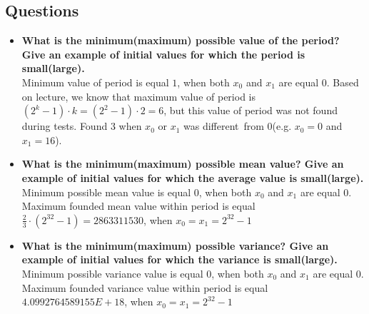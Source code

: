 \documentclass[a4paper,10pt]{article}
\begin{document}
\subsection{Questions}
\begin{itemize}
 \item \textbf{What is the minimum(maximum) possible value of the period? Give an example of initial values for which the period is small(large).} \\
Minimum value of period is equal $1$, when both $x_0$ and $x_1$ are equal $0$. Based on lecture, we know that maximum value of period is
$( 2^k - 1 ) \cdot k = ( 2^2 - 1) \cdot 2 = 6$, but this value of period was not found during tests. Found $3$ when $x_0$ or $x_1$ was different from 0(e.g. $x_0 = 0$ and $x_1 = 16$).

 \item \textbf{What is the minimum(maximum) possible mean value? Give an example of initial values for which the average value is small(large).} \\
Minimum possible mean value is equal $0$, when both $x_0$ and $x_1$ are equal $0$. Maximum founded mean value within period is equal $\frac{2}{3} \cdot (2^{32} - 1) = 2863311530$, when $x_0 = x_1 = 2^{32} -1$

 \item \textbf{What is the minimum(maximum) possible variance? Give an example of initial values for which the variance is small(large).} \\
Minimum possible variance value is equal $0$, when both $x_0$ and $x_1$ are equal $0$. Maximum founded variance value within period is equal $4.0992764589155E+18$, when $x_0 = x_1 = 2^{32} -1$


\end{itemize}
\end{document}

